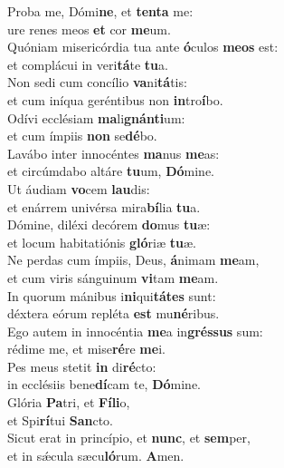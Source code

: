\evenverse Proba me, Dómi\textbf{ne}, et \textbf{ten}\textbf{ta} me:~\*\\
\evenverse ure renes meos \textbf{et} cor \textbf{me}um.\\
\oddverse Quóniam misericórdia tua ante \textbf{ó}culos \textbf{me}\textbf{os} est:~\*\\
\oddverse et complácui in veri\textbf{tá}te \textbf{tu}a.\\
\evenverse Non sedi cum concílio \textbf{va}ni\textbf{tá}tis:~\*\\
\evenverse et cum iníqua geréntibus non \textbf{in}tro\textbf{í}bo.\\
\oddverse Odívi ecclésiam \textbf{ma}li\textbf{gnán}\textbf{ti}um:~\*\\
\oddverse et cum ímpiis \textbf{non} se\textbf{dé}bo.\\
\evenverse Lavábo inter innocéntes \textbf{ma}nus \textbf{me}as:~\*\\
\evenverse et circúmdabo altáre \textbf{tu}um, \textbf{Dó}mine.\\
\oddverse Ut áudiam \textbf{vo}cem \textbf{lau}dis:~\*\\
\oddverse et enárrem univérsa mira\textbf{bí}lia \textbf{tu}a.\\
\evenverse Dómine, diléxi decórem \textbf{do}mus \textbf{tu}æ:~\*\\
\evenverse et locum habitatiónis \textbf{gló}riæ \textbf{tu}æ.\\
\oddverse Ne perdas cum ímpiis, Deus, \textbf{á}nimam \textbf{me}am,~\*\\
\oddverse et cum viris sánguinum \textbf{vi}tam \textbf{me}am.\\
\evenverse In quorum mánibus i\textbf{ni}qui\textbf{tá}\textbf{tes} sunt:~\*\\
\evenverse déxtera eórum repléta \textbf{est} mu\textbf{né}ribus.\\
\oddverse Ego autem in innocéntia \textbf{me}a in\textbf{grés}\textbf{sus} sum:~\*\\
\oddverse rédime me, et mise\textbf{ré}re \textbf{me}i.\\
\evenverse Pes meus stetit \textbf{in} di\textbf{ré}cto:~\*\\
\evenverse in ecclésiis bene\textbf{dí}cam te, \textbf{Dó}mine.\\
\oddverse Glória \textbf{Pa}tri, et \textbf{Fí}\textbf{li}o,~\*\\
\oddverse et Spi\textbf{rí}tui \textbf{San}cto.\\
\evenverse Sicut erat in princípio, et \textbf{nunc}, et \textbf{sem}per,~\*\\
\evenverse et in sǽcula sæcu\textbf{ló}rum. \textbf{A}men.\\
